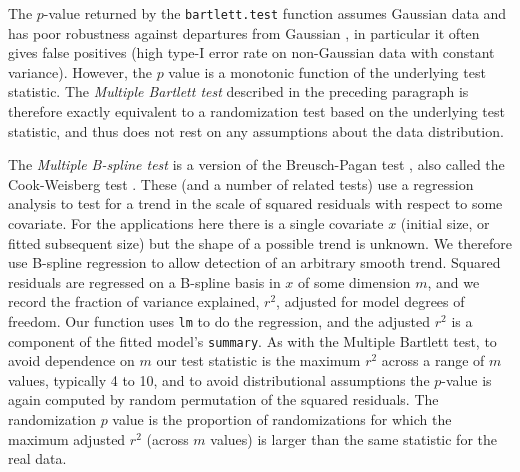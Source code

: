 \documentclass[12pt]{article}
\begin{document}
The $p$-value returned by the \texttt{bartlett.test} function assumes Gaussian data and has poor robustness against departures from Gaussian \citep{conover-etal-1981}, 
in particular it often gives false positives (high type-I error rate on non-Gaussian data with constant variance).  
However, the $p$ value is a monotonic function of the underlying test statistic. The \emph{Multiple Bartlett test} described in the preceding paragraph is therefore 
exactly equivalent to a randomization test based on the underlying test statistic, and thus does not rest on any assumptions about the data distribution. 

The \emph{Multiple B-spline test} is a version of the Breusch-Pagan test \cite{bptest}, also called the Cook-Weisberg test \cite{cwtest}. These (and a number of
related tests) use a regression analysis to test for a trend in the scale of squared residuals with respect to some covariate. 
For the applications here there is a single covariate $x$ (initial size, or fitted subsequent size) but the shape of a possible trend is unknown.  
We therefore use B-spline regression to allow detection of an arbitrary smooth trend. 
Squared residuals are regressed on a B-spline basis in $x$ of some dimension $m$, and we record the fraction of variance explained, $r^2$, adjusted for model degrees of freedom.
Our function uses \texttt{lm} to do the regression, and the adjusted $r^2$ is a component of the fitted model's \texttt{summary}.  
As with the Multiple Bartlett test, to avoid dependence on $m$ our test statistic is the maximum $r^2$ across a range of $m$ values, typically 4 to 10, 
and to avoid distributional assumptions the $p$-value is again computed by random permutation of the squared residuals. 
The randomization $p$ value is the proportion of randomizations for which the maximum adjusted $r^2$ (across $m$ values) is 
larger than the same statistic for the real data.  
\end{document}
